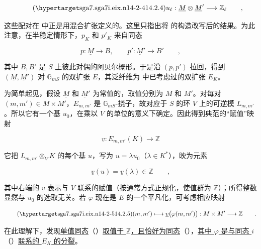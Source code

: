 \begin{equation}\tag{\SGARefTarget{sga7.sga7i.eix.n14-2-4}{14.2.4}}
 u_\ell:\underline M\otimes\underline M'
 \longrightarrow\mathbb Z_\ell\qquad ,
\end{equation}

\noindent
这些配对在  中正是用混合扩张定义的。这里只指出将  的构造改写后的结果。为此注意，在半稳定情形下，$p_K$ 和 $p'_K$ 来自同态

\begin{equation*}
 p:\underline M\longrightarrow B,\qquad
 p':\underline M'\longrightarrow B'\qquad ,
\end{equation*}

\noindent
其中 $B,B'$ 是 $S$ 上彼此对偶的阿贝尔概形。于是沿 $(p,p')$ 拉回，得到 $(\underline M,\underline M')$ 对 $\mathbb G_{mS}$ 的双扩张 $E$，其泛纤维为  中已考虑过的双扩张 $E_K$。

为简单起见，假设 $\underline M$ 和 $\underline M'$ 为常值的，取值分别为 $M$ 和 $M'$。对每对 $(m,m')\in M\times M'$，$E_{m,m'}$ 是 $\mathbb G_{mS}$-挠子，故对应于 $S$ 的环 $V$ 上的可逆模 $L_{m,m'}$。所以它有一个基 $u_0$，在乘以 $V$ 的单位的意义下确定。因此得到典范的“赋值”映射

\begin{equation*}
 \underline v:E_{m,m'}(K)\longrightarrow\mathbb Z
\end{equation*}

\noindent
它把 $L_{m,m'}\otimes_V K$ 的每个基 $u$，写为 $u=\lambda u_0$（$\lambda\in K^*$），映为元素

\begin{equation*}
 \underline v(u)=\underline v(\lambda)\in\mathbb Z\qquad ,
\end{equation*}

\noindent
其中右端的 $\underline v$ 表示与 $V$ 联系的赋值（按通常方式正规化，使值群为 $\mathbb Z$）；所得整数显然与 $u_0$ 的选取无关。若 $\varphi$ 现在是 $E$ 的一个平凡化，可考虑相应映射

\begin{equation}\tag{\SGARefTarget{sga7.sga7i.eix.n14-2-5}{14.2.5}}
 (m,m')\longmapsto\underline v\bigl(\varphi(m,m')\bigr):
 M\times M'\longrightarrow\mathbb Z\qquad .
\end{equation}

\noindent
在此理解下，发现\underline{单值同态}（）\underline{取值于 $\mathbb Z$，且恰好为同态}（），\underline{其中 $\varphi$ 是与同态 $i$}（）\underline{联系的 $E_K$ 的分裂}。

